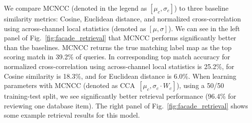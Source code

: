 \documentclass[twocolumn]{svjour3}           %
\begin{document}
We compare MCNCC (denoted in the legend as $[\mu_c,\sigma_c]$) to three
baseline similarity metrics: Cosine, Euclidean distance, and
normalized cross-correlation using across-channel local statistics (denoted as
$[\mu,\sigma]$).  We can see in the left panel of Fig.~\ref{fig:facade_retrieval}
that MCNCC performs significantly better than the baselines. MCNCC returns the
true matching label map as the top scoring match in 39.2\% of queries. In
corresponding top match accuracy for normalized cross-correlation using
across-channel local statistics is 25.2\%, for Cosine similarity is 18.3\%, and
for Euclidean distance is 6.0\%.  When learning parameters with MCNCC (denoted
as CCA~$[\mu_c,\sigma_c\cdot W_c]$), using a 50/50 training-test split, we
see significantly better retrieval performance (96.4\% for reviewing one
database item).  The right panel of Fig.~\ref{fig:facade_retrieval} shows some
example retrieval results for this model.
\end{document}
